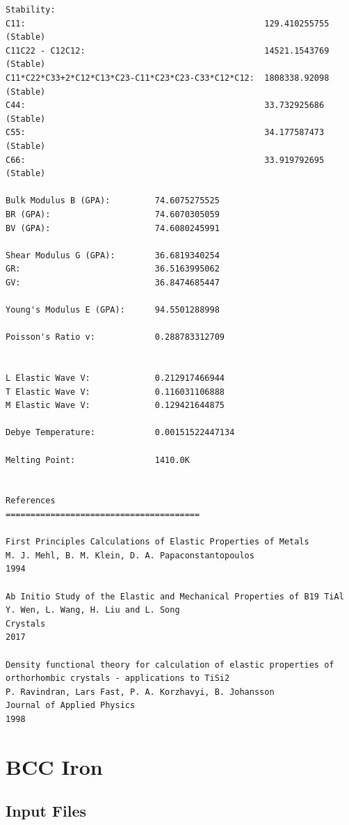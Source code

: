 \documentclass[12pt,twoside]{manual}
\begin{document}
\begin{appendices}
\begin{lstlisting}[style=inputfile,caption={Results File}]
Stability:
C11:                                                129.410255755 (Stable)
C11C22 - C12C12:                                    14521.1543769 (Stable)
C11*C22*C33+2*C12*C13*C23-C11*C23*C23-C33*C12*C12:  1808338.92098 (Stable)
C44:                                                33.732925686 (Stable)
C55:                                                34.177587473 (Stable)
C66:                                                33.919792695 (Stable)

Bulk Modulus B (GPA):         74.6075275525
BR (GPA):                     74.6070305059
BV (GPA):                     74.6080245991

Shear Modulus G (GPA):        36.6819340254
GR:                           36.5163995062
GV:                           36.8474685447

Young's Modulus E (GPA):      94.5501288998

Poisson's Ratio v:            0.288783312709


L Elastic Wave V:             0.212917466944
T Elastic Wave V:             0.116031106888
M Elastic Wave V:             0.129421644875

Debye Temperature:            0.00151522447134

Melting Point:                1410.0K 


References 
=======================================

First Principles Calculations of Elastic Properties of Metals
M. J. Mehl, B. M. Klein, D. A. Papaconstantopoulos
1994

Ab Initio Study of the Elastic and Mechanical Properties of B19 TiAl
Y. Wen, L. Wang, H. Liu and L. Song
Crystals
2017

Density functional theory for calculation of elastic properties of orthorhombic crystals - applications to TiSi2
P. Ravindran, Lars Fast, P. A. Korzhavyi, B. Johansson
Journal of Applied Physics
1998
\end{lstlisting}





\chapter{BCC Iron}

\section{Input Files}



\end{appendices}
\end{document}

